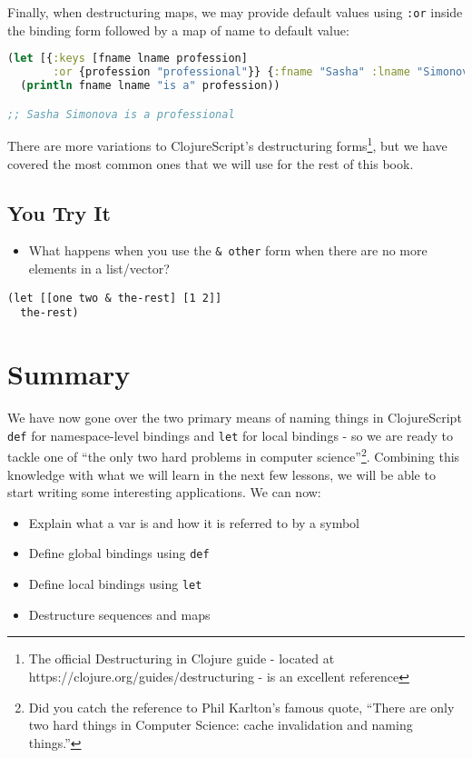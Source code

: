\documentclass[10pt,twoside,openright]{memoir}
\begin{document}
Finally, when destructuring maps, we may provide default values using
\texttt{:or} inside the binding form followed by a map of name to
default value:

\begin{lstlisting}[language=Clojure, caption={Default values}]
(let [{:keys [fname lname profession]
       :or {profession "professional"}} {:fname "Sasha" :lname "Simonova"}]
  (println fname lname "is a" profession))

;; Sasha Simonova is a professional
\end{lstlisting}

There are more variations to ClojureScript's destructuring
forms\footnote{The official Destructuring in Clojure guide - located at https://clojure.org/guides/destructuring - is an excellent reference}, but we have covered the
most common ones that we will use for the rest of this book.

\subsection{You Try It}

\begin{itemize}
\tightlist
\item
  What happens when you use the \texttt{\&\ other} form when there are
  no more elements in a list/vector?
\end{itemize}

\begin{verbatim}
(let [[one two & the-rest] [1 2]]
  the-rest)
\end{verbatim}

\section{Summary}

We have now gone over the two primary means of naming things in
ClojureScript \texttt{def} for namespace-level bindings and \texttt{let}
for local bindings - so we are ready to tackle one of ``the only two
hard problems in computer science''\footnote{Did you catch the
  reference to Phil Karlton's famous quote, ``There are only two hard
  things in Computer Science: cache invalidation and naming things.''}.
Combining this knowledge with what we will learn in the next few
lessons, we will be able to start writing some interesting applications.
We can now:

\begin{itemize}
\tightlist
\item
  Explain what a var is and how it is referred to by a symbol
\item
  Define global bindings using \texttt{def}
\item
  Define local bindings using \texttt{let}
\item
  Destructure sequences and maps
\end{itemize}
\end{document}
